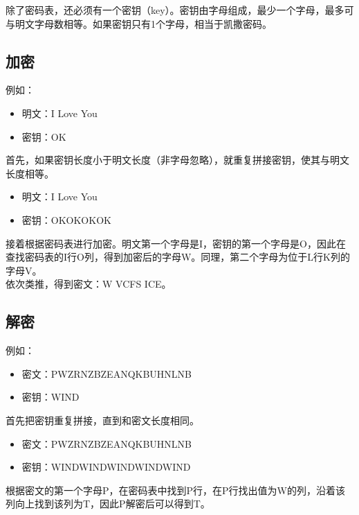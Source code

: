 除了密码表，还必须有一个密钥（key）。密钥由字母组成，最少一个字母，最多可与明文字母数相等。如果密钥只有1个字母，相当于凯撒密码。\\

\subsection{加密}

例如：

\begin{itemize}
    \item 明文：I Love You
    \item 密钥：OK
\end{itemize}

首先，如果密钥长度小于明文长度（非字母忽略），就重复拼接密钥，使其与明文长度相等。

\begin{itemize}
    \item 明文：I Love You
    \item 密钥：OKOKOKOK
\end{itemize}

接着根据密码表进行加密。明文第一个字母是I，密钥的第一个字母是O，因此在查找密码表的I行O列，得到加密后的字母W。同理，第二个字母为位于L行K列的字母V。\\

依次类推，得到密文：W VCFS ICE。\\

\subsection{解密}

例如：

\begin{itemize}
    \item 密文：PWZRNZBZEANQKBUHNLNB
    \item 密钥：WIND
\end{itemize}

首先把密钥重复拼接，直到和密文长度相同。

\begin{itemize}
    \item 密文：PWZRNZBZEANQKBUHNLNB
    \item 密钥：WINDWINDWINDWINDWIND
\end{itemize}

根据密文的第一个字母P，在密码表中找到P行，在P行找出值为W的列，沿着该列向上找到该列为T，因此P解密后可以得到T。\\


